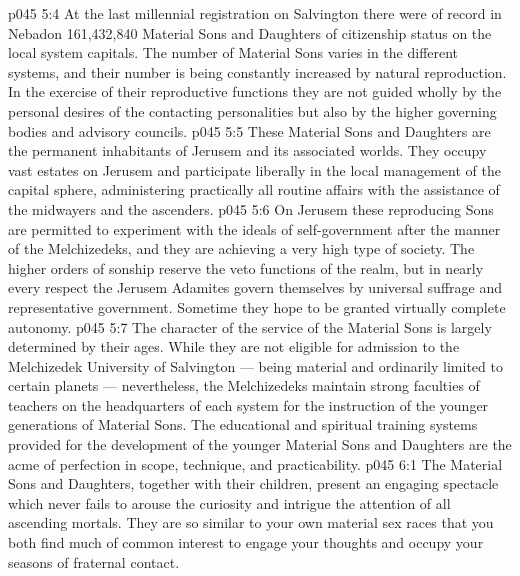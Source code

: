 \vs p045 5:4 \pc At the last millennial registration on Salvington there were of record in Nebadon 161,432,840 Material Sons and Daughters of citizenship status on the local system capitals. The number of Material Sons varies in the different systems, and their number is being constantly increased by natural reproduction. In the exercise of their reproductive functions they are not guided wholly by the personal desires of the contacting personalities but also by the higher governing bodies and advisory councils.
\vs p045 5:5 \pc These Material Sons and Daughters are the permanent inhabitants of Jerusem and its associated worlds. They occupy vast estates on Jerusem and participate liberally in the local management of the capital sphere, administering practically all routine affairs with the assistance of the midwayers and the ascenders.
\vs p045 5:6 On Jerusem these reproducing Sons are permitted to experiment with the ideals of self\hyp{}government after the manner of the Melchizedeks, and they are achieving a very high type of society. The higher orders of sonship reserve the veto functions of the realm, but in nearly every respect the Jerusem Adamites govern themselves by universal suffrage and representative government. Sometime they hope to be granted virtually complete autonomy.
\vs p045 5:7 The character of the service of the Material Sons is largely determined by their ages. While they are not eligible for admission to the Melchizedek University of Salvington --- being material and ordinarily limited to certain planets --- nevertheless, the Melchizedeks maintain strong faculties of teachers on the headquarters of each system for the instruction of the younger generations of Material Sons. The educational and spiritual training systems provided for the development of the younger Material Sons and Daughters are the acme of perfection in scope, technique, and practicability.
\vs p045 6:1 The Material Sons and Daughters, together with their children, present an engaging spectacle which never fails to arouse the curiosity and intrigue the attention of all ascending mortals. They are so similar to your own material sex races that you both find much of common interest to engage your thoughts and occupy your seasons of fraternal contact.
